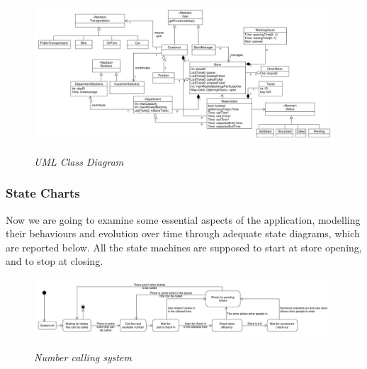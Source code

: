 \documentclass{article}
\begin{document}
		\begin{figure}
			\begin{adjustwidth}{-3cm}{}
				\centering
				\includegraphics[scale=0.38, angle=90, trim= 0 0 0 -5cm]{ClassDiagrams/classDiagram.pdf} \\
				\caption{\emph{UML Class Diagram}}
			\end{adjustwidth}
		\end{figure}
	
		\newpage
		
		
		\subsubsection{State Charts}
		
		Now we are going to examine some essential aspects of the application, modelling their behaviours and evolution over time through adequate state diagrams, which are reported below. All the state machines are supposed to start at store opening, and to stop at closing.
		
		\begin{figure}[!h]
			\centering
			\hspace*{-1.9cm}\includegraphics[scale=0.32]{StateCharts/number_calling_system.pdf} \\
			\caption{\emph{Number calling system}}
		\end{figure}
	
\end{document}
